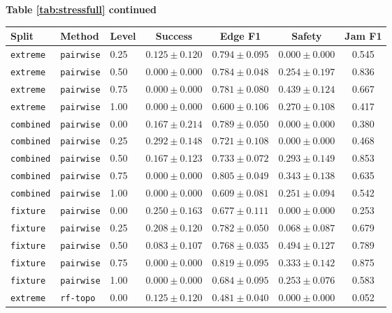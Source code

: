 \documentclass{article}
\begin{document}
\begin{center}
\textbf{Table \ref{tab:stressfull} continued}\\[0.4ex]
\begin{tabular}{lllcccc}
\toprule
Split & Method & Level & Success & Edge F1 & Safety & Jam F1 \\
\midrule
\texttt{extreme} & \texttt{pairwise} & 0.25 & $0.125 \pm 0.120$ & $0.794 \pm 0.095$ & $0.000 \pm 0.000$ & 0.545 \\
\texttt{extreme} & \texttt{pairwise} & 0.50 & $0.000 \pm 0.000$ & $0.784 \pm 0.048$ & $0.254 \pm 0.197$ & 0.836 \\
\texttt{extreme} & \texttt{pairwise} & 0.75 & $0.000 \pm 0.000$ & $0.781 \pm 0.080$ & $0.439 \pm 0.124$ & 0.667 \\
\texttt{extreme} & \texttt{pairwise} & 1.00 & $0.000 \pm 0.000$ & $0.600 \pm 0.106$ & $0.270 \pm 0.108$ & 0.417 \\
\texttt{combined} & \texttt{pairwise} & 0.00 & $0.167 \pm 0.214$ & $0.789 \pm 0.050$ & $0.000 \pm 0.000$ & 0.380 \\
\texttt{combined} & \texttt{pairwise} & 0.25 & $0.292 \pm 0.148$ & $0.721 \pm 0.108$ & $0.000 \pm 0.000$ & 0.468 \\
\texttt{combined} & \texttt{pairwise} & 0.50 & $0.167 \pm 0.123$ & $0.733 \pm 0.072$ & $0.293 \pm 0.149$ & 0.853 \\
\texttt{combined} & \texttt{pairwise} & 0.75 & $0.000 \pm 0.000$ & $0.805 \pm 0.049$ & $0.343 \pm 0.138$ & 0.635 \\
\texttt{combined} & \texttt{pairwise} & 1.00 & $0.000 \pm 0.000$ & $0.609 \pm 0.081$ & $0.251 \pm 0.094$ & 0.542 \\
\texttt{fixture} & \texttt{pairwise} & 0.00 & $0.250 \pm 0.163$ & $0.677 \pm 0.111$ & $0.000 \pm 0.000$ & 0.253 \\
\texttt{fixture} & \texttt{pairwise} & 0.25 & $0.208 \pm 0.120$ & $0.782 \pm 0.050$ & $0.068 \pm 0.087$ & 0.679 \\
\texttt{fixture} & \texttt{pairwise} & 0.50 & $0.083 \pm 0.107$ & $0.768 \pm 0.035$ & $0.494 \pm 0.127$ & 0.789 \\
\texttt{fixture} & \texttt{pairwise} & 0.75 & $0.000 \pm 0.000$ & $0.819 \pm 0.095$ & $0.333 \pm 0.142$ & 0.875 \\
\texttt{fixture} & \texttt{pairwise} & 1.00 & $0.000 \pm 0.000$ & $0.684 \pm 0.095$ & $0.253 \pm 0.076$ & 0.583 \\
\texttt{extreme} & \texttt{rf-topo} & 0.00 & $0.125 \pm 0.120$ & $0.481 \pm 0.040$ & $0.000 \pm 0.000$ & 0.052 \\

\end{tabular}
\end{center}
\end{document}
